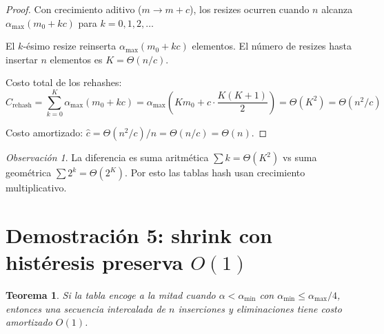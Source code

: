 \documentclass[11pt, letterpaper]{article}
\theoremstyle{definition}
\theoremstyle{plain}
\newtheorem{theorem}{Teorema}[section]
\theoremstyle{remark}
\newtheorem{remark}{Observación}[section]
\begin{document}
\begin{proof}
Con crecimiento aditivo ($m \to m + c$), los resizes ocurren cuando
$n$ alcanza $\alpha_{\max}(m_0 + kc)$ para $k = 0, 1, 2, \ldots$

El $k$-ésimo resize reinserta $\alpha_{\max}(m_0 + kc)$ elementos.
El número de resizes hasta insertar $n$ elementos es
$K = \Theta(n/c)$.

Costo total de los rehashes:
\[
  C_{\text{rehash}}
  = \sum_{k=0}^{K} \alpha_{\max}(m_0 + kc)
  = \alpha_{\max}\!\left(Km_0 + c \cdot \frac{K(K{+}1)}{2}\right)
  = \Theta(K^2)
  = \Theta(n^2/c)
\]

Costo amortizado:
$\hat{c} = \Theta(n^2/c) / n = \Theta(n/c) = \Theta(n)$.
\end{proof}

\begin{remark}
La diferencia es suma aritmética $\sum k = \Theta(K^2)$ vs suma
geométrica $\sum 2^k = \Theta(2^K)$. Por esto las tablas hash usan
crecimiento multiplicativo.
\end{remark}

\section{Demostración 5: shrink con histéresis preserva $O(1)$}

\begin{theorem}\label{thm:shrink}
Si la tabla encoge a la mitad cuando
$\alpha < \alpha_{\min}$ con
$\alpha_{\min} \leq \alpha_{\max}/4$, entonces una secuencia
intercalada de $n$ inserciones y eliminaciones tiene costo amortizado
$O(1)$.
\end{theorem}
\end{document}
